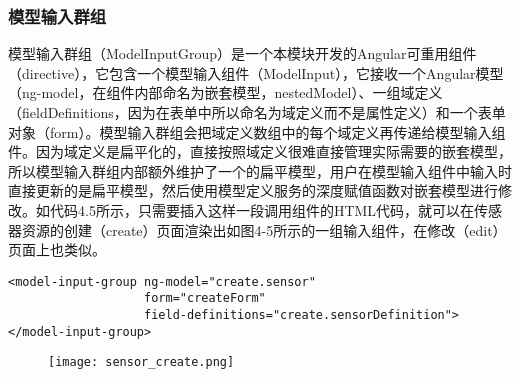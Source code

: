 \subsubsection{模型输入群组}
模型输入群组（ModelInputGroup）是一个本模块开发的Angular可重用组件（directive），它包含一个模型输入组件（ModelInput），它接收一个Angular模型（ng-model，在组件内部命名为嵌套模型，nestedModel）、一组域定义（fieldDefinitions，因为在表单中所以命名为域定义而不是属性定义）和一个表单对象（form）。模型输入群组会把域定义数组中的每个域定义再传递给模型输入组件。因为域定义是扁平化的，直接按照域定义很难直接管理实际需要的嵌套模型，所以模型输入群组内部额外维护了一个的扁平模型，用户在模型输入组件中输入时直接更新的是扁平模型，然后使用模型定义服务的深度赋值函数对嵌套模型进行修改。如代码4.5所示，只需要插入这样一段调用组件的HTML代码，就可以在传感器资源的创建（create）页面渲染出如图4-5所示的一组输入组件，在修改（edit）页面上也类似。
\begin{lstlisting}[language={HTML5}, caption={传感器创建页面中的模型输入群组代码}]
<model-input-group ng-model="create.sensor"
                   form="createForm"
                   field-definitions="create.sensorDefinition">
</model-input-group>
\end{lstlisting}
\begin{figure}[H]
 \centering
 \texttt{[image: sensor\_create.png]}
\end{figure}
